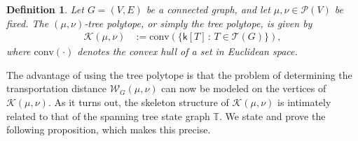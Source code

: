 \documentclass[11pt,a4paper]{article}
\newcommand{\prob}{{\mathscr{P}}}
\newcommand{\wass}{{\mathcal{W}}}
\newcommand{\setoftrees}{{\mathcal{T}}}
\newcommand{\stategraph}{{\mathbb{T}}}
\newcommand{\embedding}{{\mathsf{k}}}
\newcommand{\flowpoly}{{\mathcal{K}}}
\newtheorem{remark}[theorem]{Remark}
\newtheorem{definition}[theorem]{Definition}
\begin{document}


    \begin{definition}\label{def:flow-polytope}
        Let $G=(V,E)$ be a connected graph, and let $\mu,\nu\in\prob(V)$ be fixed. The \emph{$(\mu,\nu)$-tree polytope,} or simply the tree polytope, is given by
            \begin{align*}
                \flowpoly(\mu,\nu) &:= \mathrm{conv}\left(\{\embedding[T] \,:\, T\in\mathcal{T}(G)\} \right),
            \end{align*}
        where $\mathrm{conv}(\cdot)$ denotes the convex hull of a set in Euclidean space.
    \end{definition}    

    The advantage of using the tree polytope is that the problem of determining the transportation distance $\wass_G(\mu,\nu)$ can now be modeled on the vertices of $\flowpoly(\mu,\nu)$. As it turns out, the skeleton structure of $\flowpoly(\mu,\nu)$ is intimately related to that of the spanning tree state graph $\stategraph$. We state and prove the following proposition, which makes this precise.
\end{document}
